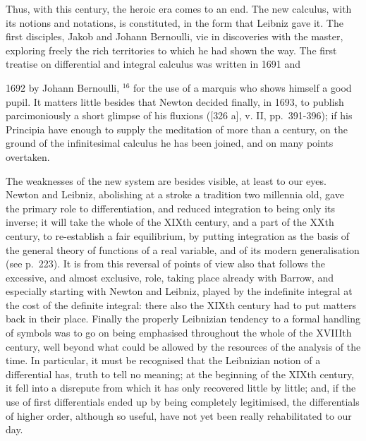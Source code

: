 Thus, with this century, the heroic era comes to an end. The new calculus, with its notions and notations, is constituted, in the form that Leibniz gave it. The first disciples, Jakob and Johann Bernoulli, vie in discoveries with the master, exploring freely the rich territories to which he had shown the way. The first treatise on differential and integral calculus was written in 1691 and

1692 by Johann Bernoulli, \(^{16}\) for the use of a marquis who shows himself a good pupil. It matters little besides that Newton decided finally, in 1693, to publish parcimoniously a short glimpse of his fluxions ({[}326 a{]}, v. II, pp.~391-396); if his Principia have enough to supply the meditation of more than a century, on the ground of the infinitesimal calculus he has been joined, and on many points overtaken.

The weaknesses of the new system are besides visible, at least to our eyes. Newton and Leibniz, abolishing at a stroke a tradition two millennia old, gave the primary role to differentiation, and reduced integration to being only its inverse; it will take the whole of the XIXth century, and a part of the XXth century, to re-establish a fair equilibrium, by putting integration as the basis of the general theory of functions of a real variable, and of its modern generalisation (see p.~223). It is from this reversal of points of view also that follows the excessive, and almost exclusive, role, taking place already with Barrow, and especially starting with Newton and Leibniz, played by the indefinite integral at the cost of the definite integral: there also the XIXth century had to put matters back in their place. Finally the properly Leibnizian tendency to a formal handling of symbols was to go on being emphasised throughout the whole of the XVIIIth century, well beyond what could be allowed by the resources of the analysis of the time. In particular, it must be recognised that the Leibnizian notion of a differential has, truth to tell no meaning; at the beginning of the XIXth century, it fell into a disrepute from which it has only recovered little by little; and, if the use of first differentials ended up by being completely legitimised, the differentials of higher order, although so useful, have not yet been really rehabilitated to our day.
